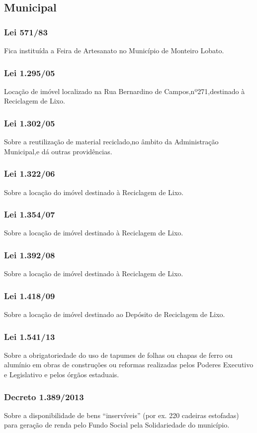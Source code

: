 \begin{subapend}
	\subsection{Municipal}
	\begin{subsubapend}
		\item \subsubsection{Lei 571/83}
		Fica instituída a Feira de Artesanato no Município de Monteiro Lobato.
		\subsubsection{Lei 1.295/05}
		Locação de imóvel localizado na Rua Bernardino de Campos,nº271,destinado à Reciclagem de Lixo.
		\subsubsection{Lei 1.302/05}
		Sobre a reutilização de material reciclado,no âmbito da Administração Municipal,e dá outras providências.
		\subsubsection{Lei 1.322/06}
		Sobre a locação do imóvel destinado à Reciclagem de Lixo.
		\subsubsection{Lei 1.354/07}
		Sobre a locação de imóvel destinado à Reciclagem de Lixo.
		\subsubsection{Lei 1.392/08}
		Sobre a locação de imóvel destinado à Reciclagem de Lixo.
		\subsubsection{Lei 1.418/09}
		Sobre a locação de imóvel destinado ao Depósito de Reciclagem de Lixo.
		\subsubsection{Lei 1.541/13}
		Sobre a obrigatoriedade do uso de tapumes de folhas ou chapas de ferro ou alumínio em obras de construções ou reformas realizadas pelos Poderes Executivo e Legislativo e pelos órgãos estaduais.
		\subsubsection{Decreto 1.389/2013}
		Sobre a disponibilidade de bens “inservíveis” (por ex. 220 cadeiras estofadas) para geração de renda pelo Fundo Social pela Solidariedade do município.
	\end{subsubapend}
\end{subapend}



